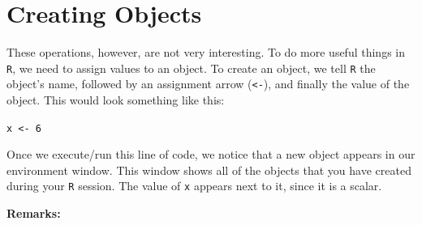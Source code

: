 \documentclass[]{article}
\begin{document}
\section{Creating Objects}\label{creating-objects}

These operations, however, are not very interesting. To do more useful
things in \texttt{R}, we need to assign values to an object. To create
an object, we tell \texttt{R} the object's name, followed by an
assignment arrow (\texttt{\textless{}-}), and finally the value of the
object. This would look something like this:

\texttt{x\ \textless{}-\ 6}

Once we execute/run this line of code, we notice that a new object
appears in our environment window. This window shows all of the objects
that you have created during your \texttt{R} session. The value of
\texttt{x} appears next to it, since it is a scalar.

\textbf{Remarks:}
\end{document}
